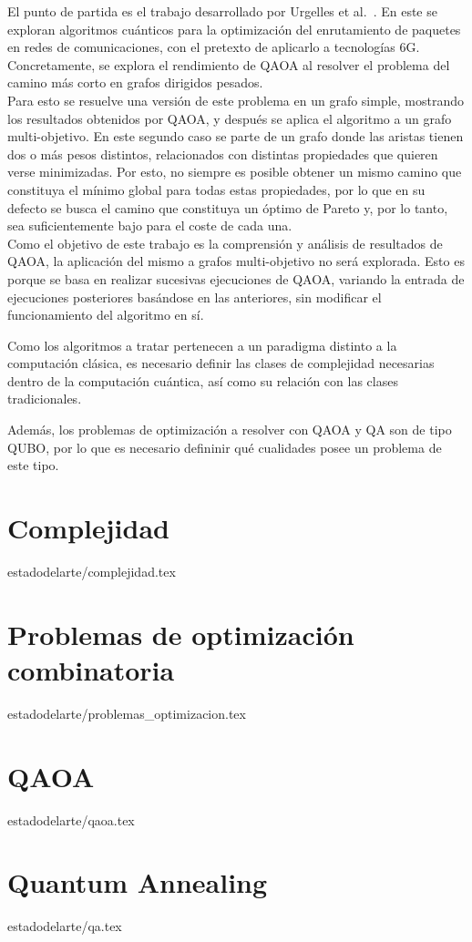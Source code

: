 El punto de partida es el trabajo desarrollado por Urgelles et al.~\cite{multi-objective_routing_optimization}.
En este se exploran algoritmos cuánticos para la optimización del enrutamiento de paquetes en redes de comunicaciones, con el pretexto de aplicarlo a tecnologías 6G.
Concretamente, se explora el rendimiento de QAOA al resolver el problema del camino más corto en grafos dirigidos pesados.
\\
Para esto se resuelve una versión de este problema en un grafo simple, mostrando los resultados obtenidos por QAOA, y después se aplica el algoritmo a un grafo multi-objetivo.
En este segundo caso se parte de un grafo donde las aristas tienen dos o más pesos distintos, relacionados con distintas propiedades que quieren verse minimizadas.
Por esto, no siempre es posible obtener un mismo camino que constituya el mínimo global para todas estas propiedades, por lo que en su defecto se busca el camino que constituya un óptimo de Pareto y, por lo tanto, sea suficientemente bajo para el coste de cada una.
\\
Como el objetivo de este trabajo es la comprensión y análisis de resultados de QAOA, la aplicación del mismo a grafos multi-objetivo no será explorada.
Esto es porque se basa en realizar sucesivas ejecuciones de QAOA, variando la entrada de ejecuciones posteriores basándose en las anteriores, sin modificar el funcionamiento del algoritmo en sí.

Como los algoritmos a tratar pertenecen a un paradigma distinto a la computación clásica, es necesario definir las clases de complejidad necesarias dentro de la computación cuántica, así como su relación con las clases tradicionales.

Además, los problemas de optimización a resolver con QAOA y QA son de tipo QUBO, por lo que es necesario defininir qué cualidades posee un problema de este tipo.

\section{Complejidad}{estadodelarte/complejidad.tex}

\section{Problemas de optimización combinatoria\label{sec:2-problemas de optimizacion combinatoria}}{estadodelarte/problemas_optimizacion.tex}

\section{QAOA}{estadodelarte/qaoa.tex}

\section{Quantum Annealing}{estadodelarte/qa.tex}

